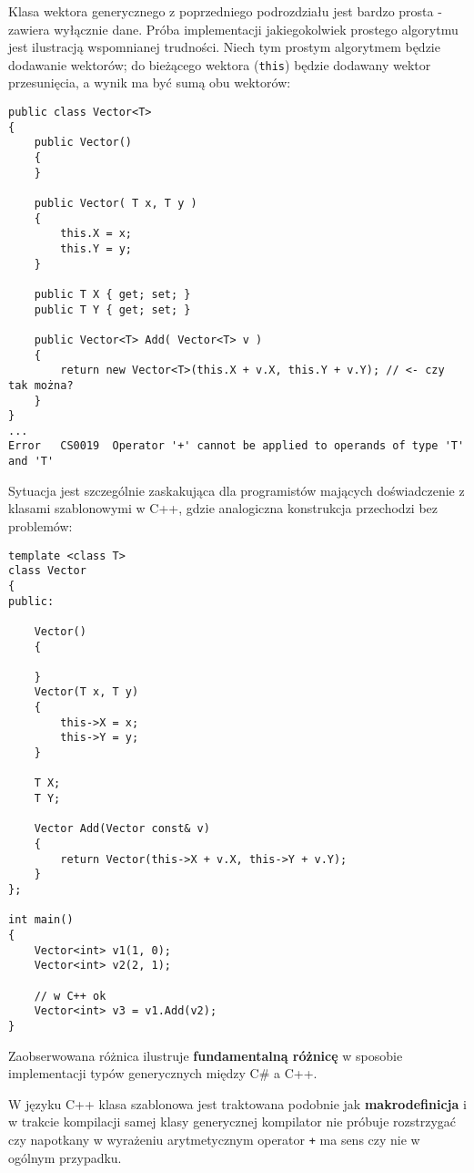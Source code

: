 Klasa wektora generycznego z poprzedniego podrozdziału jest bardzo prosta - zawiera wyłącznie dane.
Próba implementacji jakiegokolwiek prostego algorytmu jest ilustracją wspomnianej trudności. Niech tym prostym
algorytmem będzie dodawanie wektorów; do bieżącego wektora ({\tt this}) będzie dodawany wektor przesunięcia, a wynik
ma być sumą obu wektorów:

\begin{scriptsize}
\begin{verbatim}
public class Vector<T>
{
    public Vector()
    {
    }

    public Vector( T x, T y )
    {
        this.X = x;
        this.Y = y;
    }

    public T X { get; set; }
    public T Y { get; set; }

    public Vector<T> Add( Vector<T> v )
    {
        return new Vector<T>(this.X + v.X, this.Y + v.Y); // <- czy tak można?
    }
}
...
Error	CS0019	Operator '+' cannot be applied to operands of type 'T' and 'T'	
\end{verbatim}
\end{scriptsize}

Sytuacja jest szczególnie zaskakująca dla programistów mających doświadczenie z klasami szablonowymi w C++, gdzie
analogiczna konstrukcja przechodzi bez problemów:

\begin{scriptsize}
\begin{verbatim}
template <class T> 
class Vector
{
public:

    Vector()
    {

    }
    Vector(T x, T y)
    {
        this->X = x;
        this->Y = y;
    }

    T X;
    T Y;

    Vector Add(Vector const& v)
    {
        return Vector(this->X + v.X, this->Y + v.Y);
    }
};

int main()
{
    Vector<int> v1(1, 0);
    Vector<int> v2(2, 1);

    // w C++ ok
    Vector<int> v3 = v1.Add(v2);
}
\end{verbatim}
\end{scriptsize}

Zaobserwowana różnica ilustruje {\bf fundamentalną różnicę} w sposobie implementacji typów generycznych między
C\# a C++.

W języku C++ klasa szablonowa jest traktowana podobnie jak {\bf makrodefinicja} i w trakcie kompilacji samej klasy
generycznej kompilator nie próbuje rozstrzygać czy napotkany w wyrażeniu arytmetycznym operator {\tt +}
ma sens czy nie w ogólnym przypadku.

